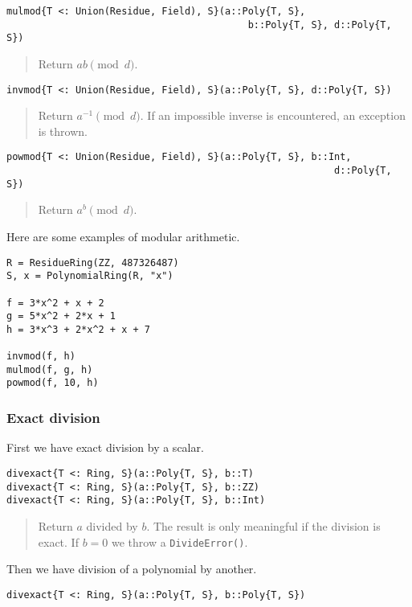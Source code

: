 \documentclass[a4paper,10pt]{article}
\newcommand{\code}{\lstinline}
\newcommand{\desc}[1]{\vspace{-3mm}\begin{quote}#1\end{quote}}
\begin{document}
{{{\begin{lstlisting}
mulmod{T <: Union(Residue, Field), S}(a::Poly{T, S}, 
                                          b::Poly{T, S}, d::Poly{T, S})
\end{lstlisting}

\desc{Return $ab \pmod{d}$.}

\begin{lstlisting}
invmod{T <: Union(Residue, Field), S}(a::Poly{T, S}, d::Poly{T, S})
\end{lstlisting}

\desc{Return $a^{-1} \pmod{d}$. If an impossible inverse is encountered, an
exception is thrown.}

\begin{lstlisting}
powmod{T <: Union(Residue, Field), S}(a::Poly{T, S}, b::Int, 
                                                         d::Poly{T, S})
\end{lstlisting}

\desc{Return $a^b \pmod{d}$.}

Here are some examples of modular arithmetic.

\begin{lstlisting}
R = ResidueRing(ZZ, 487326487)
S, x = PolynomialRing(R, "x")

f = 3*x^2 + x + 2
g = 5*x^2 + 2*x + 1
h = 3*x^3 + 2*x^2 + x + 7

invmod(f, h)
mulmod(f, g, h)
powmod(f, 10, h)
\end{lstlisting}

\subsubsection{Exact division}

First we have exact division by a scalar.

\begin{lstlisting}
divexact{T <: Ring, S}(a::Poly{T, S}, b::T)
divexact{T <: Ring, S}(a::Poly{T, S}, b::ZZ)
divexact{T <: Ring, S}(a::Poly{T, S}, b::Int)
\end{lstlisting}

\desc{Return $a$ divided by $b$. The result is only meaningful if the division is
exact. If $b = 0$ we throw a \code{DivideError()}.}

Then we have division of a polynomial by another.

\begin{lstlisting}
divexact{T <: Ring, S}(a::Poly{T, S}, b::Poly{T, S})
\end{lstlisting}

}}}
\end{document}
